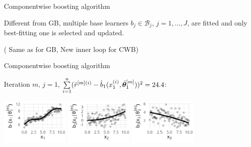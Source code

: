 \documentclass[11pt,compress,t,notes=noshow, xcolor=table]{beamer}
\begin{document}

\begin{vbframe}{Componentwise boosting algorithm}

\footnotesize{Different from GB, multiple base learners 
$b_j\in\mathcal{B}_j$, $j = 1, \dots, J$, are fitted %
and only best-fitting one
is selected and updated.}
\vspace{-0.3cm}

\vspace{-0.3cm}
\scriptsize{({\color{lightgray} Same as for GB, \color{algocol} New inner loop for CWB})}

\end{vbframe}


\begin{vbframe}{Componentwise boosting algorithm}



{\footnotesize Iteration $m$, $j = 1$, $\sum  \limits_{i=1}^n (\tilde{r}^{[m](i)} - \hat{b}_1(x^{(i)}_1, \hat{\bm{\theta}}^{[m]}_1))^2 = 24.4$: }
\begin{center}
\includegraphics[width=0.25\textwidth]{figure/boosting-cwb-bl1-points.png}
\hspace*{0.5cm}
{\includegraphics[width=0.25\textwidth]{figure/boosting-cwb-bl2-points.png}}
\hspace*{0.5cm}
{\includegraphics[width=0.25\textwidth]{figure/boosting-cwb-bl3-points.png}}
\end{center}
\end{vbframe}
\end{document}
